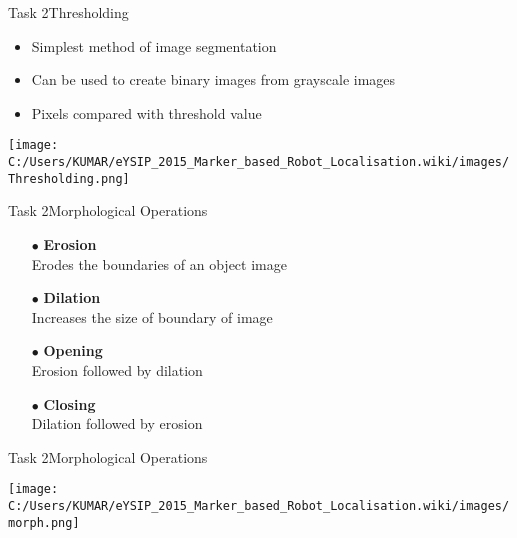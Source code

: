\documentclass[10pt, a4paper]{beamer}
\begin{document}
\begin{frame}{Task 2}{Thresholding}
	\begin{itemize}
		\item Simplest method of image segmentation
		\item Can be used to create binary images from grayscale images
		\item Pixels compared with threshold value
	\end{itemize}
	\begin{minipage}{0.5\textwidth}
		\centering
		\texttt{[image: C:/Users/KUMAR/eYSIP\_2015\_Marker\_based\_Robot\_Localisation.wiki/images/Thresholding.png]}
		\label{fig:sfig3}
		
		
	\end{minipage}	
\end{frame}		


\begin{frame}{Task 2}{Morphological Operations}
	\
	\begin{itemize}
		\item[$\bullet$] \textbf{Erosion}
		\\Erodes the boundaries of an object image
		\item[$\bullet$] \textbf{Dilation}
		\\Increases the size of boundary of image
		\item[$\bullet$] \textbf{Opening}
		\\Erosion followed by dilation
		\item[$\bullet$] \textbf{Closing}
		\\Dilation followed by erosion	
	\end{itemize}
\end{frame}
\begin{frame}{Task 2}{Morphological Operations}
	
	\begin{minipage}{0.5\textwidth}
		\centering
		\texttt{[image: C:/Users/KUMAR/eYSIP\_2015\_Marker\_based\_Robot\_Localisation.wiki/images/morph.png]}
		
		
	\end{minipage}		
	
\end{frame}	
\end{document}
